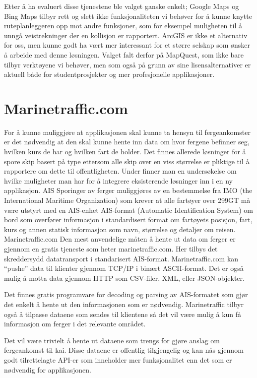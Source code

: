 \documentclass[a4paper,norsk,oneside]{book}
\begin{document}
Etter å ha evaluert disse tjenestene ble valget ganske enkelt; Google Maps og Bing Maps tilbyr rett og slett ikke funksjonaliteten vi behøver for å kunne knytte ruteplanleggeren opp mot andre funksjoner, som for eksempel muligheten til å unngå veistrekninger der en kollisjon er rapportert. ArcGIS er ikke et alternativ for oss, men kunne godt ha vært mer interessant for et større selskap som ønsker å arbeide med denne løsningen. Valget falt derfor på MapQuest, som ikke bare tilbyr verktøyene vi behøver, men som også på grunn av sine lisensalternativer er aktuell både for studentprosjekter og mer profesjonelle applikasjoner.

\section{Marinetraffic.com}
For å kunne muliggjøre at applikasjonen skal kunne ta hensyn til fergeankomster er det nødvendig at den skal kunne hente inn data om hvor fergene befinner seg, hvilken kurs de har og hvilken fart de holder. Det finnes allerede løsninger for å spore skip basert på type ettersom alle skip over en viss størrelse er pliktige til å rapportere om dette til offentligheten. Under finner man en undersøkelse om hvilke muligheter man har for å integrere eksisterende løsninger inn i en ny applikasjon.
AIS
Sporinger av ferger muliggjøres av en bestemmelse fra IMO (the International Maritime Organization) som krever at alle fartøyer over 299GT må være utstyrt med en AIS-enhet AIS-format (Automatic Identification System) om bord som overfører informasjon i standardisert format om fartøyets posisjon, fart, kurs og annen statisk informasjon som navn, størrelse og detaljer om reisen.\cite{laws}
Marinetraffic.com
Den mest anvendelige måten å hente ut data om ferger er gjennom en gratis tjeneste som heter marinetraffic.com. Her tilbys det skreddersydd datatransport i standarisert AIS-format. Marinetraffic.com kan “pushe” data til klienter gjennom TCP/IP i binært ASCII-format. Det er også mulig å motta data gjennom HTTP som CSV-filer, XML, eller JSON-objekter. \cite{mar}

Det finnes gratis programvare for decoding og parsing av AIS-formatet som gjør det enkelt å hente ut den informasjonen som er nødvendig. Marinetraffic tilbyr også å tilpasse dataene som sendes til klientene så det vil være mulig å kun få informasjon om ferger i det relevante området.

Det vil være trivielt å hente ut dataene som trengs for gjøre anslag om fergeankomst til kai. Disse dataene er offentlig tilgjengelig og kan nås gjennom godt tilrettelagte API-er som inneholder mer funksjonalitet enn det som er nødvendig for applikasjonen.
\end{document}
